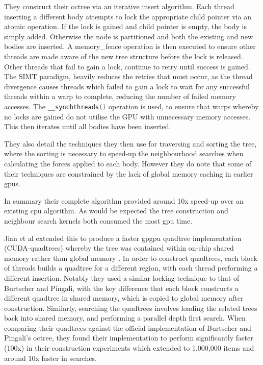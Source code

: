       They construct their octree via an iterative insert algorithm. Each thread inserting a different body attempts to lock the appropriate child pointer via an \gls{atomic} operation. If the lock is gained and child pointer is empty, the body is simply added. Otherwise the node is partitioned and both the existing and new bodies are inserted. A \gls{memory_fence} operation is then executed to ensure other threads are made aware of the new tree structure before the lock is released. Other threads that fail to gain a lock, continue to retry until success is gained. The SIMT paradigm, heavily reduces the retries that must occur, as the thread divergence causes threads which failed to gain a lock to wait for any successful threads within a warp to complete, reducing the number of failed memory accesses. The \lstinline[language={C++}]!__synchthreads()! operation is used, to ensure that warps whereby no locks are gained do not utilise the GPU with unnecessary memory accesses. This then iterates until all bodies have been inserted.
      
      They also detail the techniques they then use for traversing and sorting the tree, where the sorting is necessary to speed-up the neighbourhood searches when calculating the forces applied to each body. However they do note that some of their techniques are constrained by the lack of global memory caching in earlier \glspl{gpu}. 
      
      In summary their complete algorithm provided around 10x speed-up over an existing \gls{cpu} algorithm. As would be expected the tree construction and neighbour search kernels both consumed the most \gls{gpu} time.
      
      Jian et al extended this to produce a faster \gls{gpgpu} quadtree implementation (CUDA-quadtrees) whereby the tree was contained within \gls{on-chip} shared memory rather than global memory \cite{JYL12}. In order to construct quadtrees, each block of threads builds a quadtree for a different region, with each thread performing a different insertion. Notably they used a similar locking technique to that of Burtscher and Pingali, with the key difference that each block constructs a different quadtree in shared memory, which is copied to global memory after construction. Similarly, searching the quadtrees involves loading the related trees back into shared memory, and performing a parallel depth first search. When comparing their quadtrees against the official implementation of Burtscher and Pingali's octree, they found their implementation to perform significantly faster (100x) in their  construction experiments which extended to 1,000,000 items and around 10x faster in searches.
  
